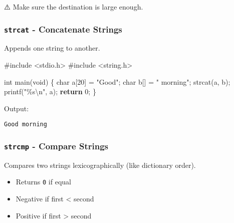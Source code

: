 \documentclass[
  letterpaper,
  DIV=11,
  numbers=noendperiod]{scrreprt}
\newenvironment{Shaded}{\begin{snugshade}}{\end{snugshade}}
\newcommand{\ControlFlowTok}[1]{\textcolor[rgb]{0.00,0.23,0.31}{\textbf{#1}}}
\newcommand{\DataTypeTok}[1]{\textcolor[rgb]{0.68,0.00,0.00}{#1}}
\newcommand{\DecValTok}[1]{\textcolor[rgb]{0.68,0.00,0.00}{#1}}
\newcommand{\ImportTok}[1]{\textcolor[rgb]{0.00,0.46,0.62}{#1}}
\newcommand{\NormalTok}[1]{\textcolor[rgb]{0.00,0.23,0.31}{#1}}
\newcommand{\OperatorTok}[1]{\textcolor[rgb]{0.37,0.37,0.37}{#1}}
\newcommand{\PreprocessorTok}[1]{\textcolor[rgb]{0.68,0.00,0.00}{#1}}
\newcommand{\SpecialCharTok}[1]{\textcolor[rgb]{0.37,0.37,0.37}{#1}}
\newcommand{\StringTok}[1]{\textcolor[rgb]{0.13,0.47,0.30}{#1}}
\providecommand{\tightlist}{%
  \setlength{\itemsep}{0pt}\setlength{\parskip}{0pt}}
\begin{document}
⚠️ Make sure the destination is large enough.

\subsubsection{\texorpdfstring{\texttt{strcat} - Concatenate
Strings}{strcat - Concatenate Strings}}\label{strcat---concatenate-strings}

Appends one string to another.

\begin{Shaded}
\begin{Highlighting}[]
\PreprocessorTok{\#include }\ImportTok{\textless{}stdio.h\textgreater{}}
\PreprocessorTok{\#include }\ImportTok{\textless{}string.h\textgreater{}}

\DataTypeTok{int}\NormalTok{ main}\OperatorTok{(}\DataTypeTok{void}\OperatorTok{)} \OperatorTok{\{}
    \DataTypeTok{char}\NormalTok{ a}\OperatorTok{[}\DecValTok{20}\OperatorTok{]} \OperatorTok{=} \StringTok{"Good"}\OperatorTok{;}
    \DataTypeTok{char}\NormalTok{ b}\OperatorTok{[]} \OperatorTok{=} \StringTok{" morning"}\OperatorTok{;}
\NormalTok{    strcat}\OperatorTok{(}\NormalTok{a}\OperatorTok{,}\NormalTok{ b}\OperatorTok{);}
\NormalTok{    printf}\OperatorTok{(}\StringTok{"}\SpecialCharTok{\%s\textbackslash{}n}\StringTok{"}\OperatorTok{,}\NormalTok{ a}\OperatorTok{);}
    \ControlFlowTok{return} \DecValTok{0}\OperatorTok{;}
\OperatorTok{\}}
\end{Highlighting}
\end{Shaded}

Output:

\begin{verbatim}
Good morning
\end{verbatim}

\subsubsection{\texorpdfstring{\texttt{strcmp} - Compare
Strings}{strcmp - Compare Strings}}\label{strcmp---compare-strings}

Compares two strings lexicographically (like dictionary order).

\begin{itemize}
\tightlist
\item
  Returns \texttt{0} if equal
\item
  Negative if first \textless{} second
\item
  Positive if first \textgreater{} second
\end{itemize}
\end{document}
